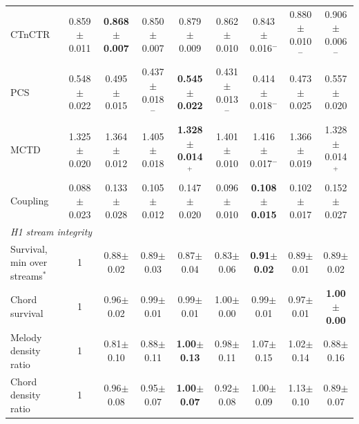 \begin{table}[htbp]
\begin{center}
\begin{tabular}{|l|c|c|c|c|c|c|c|c|}
CTnCTR & 0.859$\pm$0.011 & \textbf{0.868$\pm$0.007} & 0.850$\pm$0.007 & 0.879$\pm$0.009 & 0.862$\pm$0.010 & 0.843$\pm$0.016$^{\mathrm{-}}$ & 0.880$\pm$0.010$^{\mathrm{-}}$ & 0.906$\pm$0.006$^{\mathrm{-}}$ \\
PCS & 0.548$\pm$0.022 & 0.495$\pm$0.015 & 0.437$\pm$0.018$^{\mathrm{-}}$ & \textbf{0.545$\pm$0.022} & 0.431$\pm$0.013$^{\mathrm{-}}$ & 0.414$\pm$0.018$^{\mathrm{-}}$ & 0.473$\pm$0.025 & 0.557$\pm$0.020 \\
MCTD & 1.325$\pm$0.020 & 1.364$\pm$0.012 & 1.405$\pm$0.018 & \textbf{1.328$\pm$0.014}$^{\mathrm{+}}$ & 1.401$\pm$0.010 & 1.416$\pm$0.017$^{\mathrm{-}}$ & 1.366$\pm$0.019 & 1.328$\pm$0.014$^{\mathrm{+}}$ \\
Coupling & 0.088$\pm$0.023 & 0.133$\pm$0.028 & 0.105$\pm$0.012 & 0.147$\pm$0.020 & 0.096$\pm$0.010 & \textbf{0.108$\pm$0.015} & 0.102$\pm$0.017 & 0.152$\pm$0.027 \\
\multicolumn{9}{|l|}{\textit{H1 stream integrity}} \\
\hline
Survival, min over streams$^*$ & 1 & 0.88$\pm$0.02 & 0.89$\pm$0.03 & 0.87$\pm$0.04 & 0.83$\pm$0.06 & \textbf{0.91$\pm$0.02} & 0.89$\pm$0.01 & 0.89$\pm$0.02 \\
Chord survival & 1 & 0.96$\pm$0.02 & 0.99$\pm$0.01 & 0.99$\pm$0.01 & 1.00$\pm$0.00 & 0.99$\pm$0.01 & 0.97$\pm$0.01 & \textbf{1.00$\pm$0.00} \\
Melody density ratio & 1 & 0.81$\pm$0.10 & 0.88$\pm$0.11 & \textbf{1.00$\pm$0.13} & 0.98$\pm$0.11 & 1.07$\pm$0.15 & 1.02$\pm$0.14 & 0.88$\pm$0.16 \\
Chord density ratio & 1 & 0.96$\pm$0.08 & 0.95$\pm$0.07 & \textbf{1.00$\pm$0.07} & 0.92$\pm$0.08 & 1.00$\pm$0.09 & 1.13$\pm$0.10 & 0.89$\pm$0.07 \\
\hline
\end{tabular}
\label{tab:e1}
\end{center}
\end{table}

